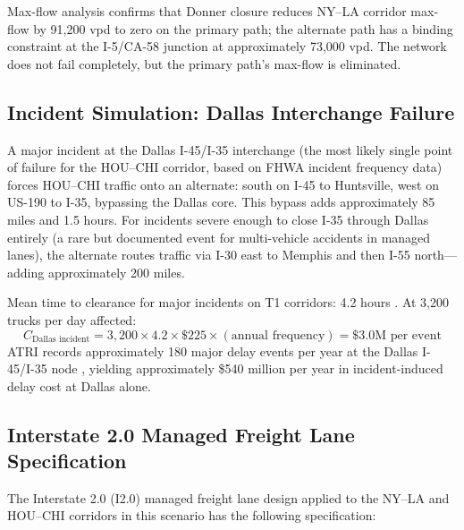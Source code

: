 Max-flow analysis confirms that Donner closure reduces NY--LA corridor max-flow by 91,200 vpd to zero on the primary path; the alternate path has a binding constraint at the I-5/CA-58 junction at approximately 73,000 vpd. The network does not fail completely, but the primary path's max-flow is eliminated.

\subsection{Incident Simulation: Dallas Interchange Failure}

A major incident at the Dallas I-45/I-35 interchange (the most likely single point of failure for the HOU--CHI corridor, based on FHWA incident frequency data) forces HOU--CHI traffic onto an alternate: south on I-45 to Huntsville, west on US-190 to I-35, bypassing the Dallas core. This bypass adds approximately 85 miles and 1.5 hours. For incidents severe enough to close I-35 through Dallas entirely (a rare but documented event for multi-vehicle accidents in managed lanes), the alternate routes traffic via I-30 east to Memphis and then I-55 north---adding approximately 200 miles.

Mean time to clearance for major incidents on T1 corridors: 4.2 hours \citep{FHWA_freight2023}. At 3,200 trucks per day affected:
\begin{equation}
  C_{\text{Dallas incident}} = 3{,}200 \times 4.2 \times \$225 \times (\text{annual frequency}) = \$3.0\text{M per event}
\end{equation}
ATRI records approximately 180 major delay events per year at the Dallas I-45/I-35 node \citep{ATRI_costs2024}, yielding approximately \$540 million per year in incident-induced delay cost at Dallas alone.

\subsection{Interstate 2.0 Managed Freight Lane Specification}

The Interstate 2.0 (I2.0) managed freight lane design applied to the NY--LA and HOU--CHI corridors in this scenario has the following specification:

